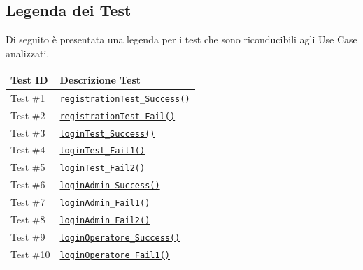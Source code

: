\documentclass{article}
\newcommand{\code}[1]{\texttt{#1}}
\begin{document}
\newpage\subsection*{Legenda dei Test}
Di seguito è presentata una legenda per i test che sono riconducibili agli Use Case analizzati.
\begin{table}[h!]
    \centering
    \begin{tabular}{>{\raggedright}p{} p{}}
        \textbf{Test ID} & \textbf{Descrizione Test} \\
        \hline
        Test \#1 & \hyperref[fig:snippet_LoginClienteControllerTest]{\code{registrationTest\_Success()}}
        \label{test_1}\\
        
        Test \#2 & \hyperref[fig:snippet_LoginClienteControllerTest]{\code{registrationTest\_Fail()}}
        \label{test_2}\\
        
        Test \#3 & \hyperref[fig:snippet_LoginClienteControllerTest]{\code{loginTest\_Success()}}
        \label{test_3}\\
        
        Test \#4 & \hyperref[fig:snippet_LoginClienteControllerTest]{\code{loginTest\_Fail1()}}
        \label{test_4}\\
        
        Test \#5 & \hyperref[fig:snippet_LoginClienteControllerTest]{\code{loginTest\_Fail2()}}
        \label{test_5}\\
        
        Test \#6 & \hyperref[fig:snippet_LoginPersonaleControllerTest]{\code{loginAdmin\_Success()}}
        \label{test_6}\\
        
        Test \#7 & \hyperref[fig:snippet_LoginPersonaleControllerTest]{\code{loginAdmin\_Fail1()}}
        \label{test_7}\\
        
        Test \#8 & \hyperref[fig:snippet_LoginPersonaleControllerTest]{\code{loginAdmin\_Fail2()}}
        \label{test_8}\\

        Test \#9 & \hyperref[fig:snippet_LoginPersonaleControllerTest]{\code{loginOperatore\_Success()}}
        \label{test_9}\\
        
        Test \#10 & \hyperref[fig:snippet_LoginPersonaleControllerTest]{\code{loginOperatore\_Fail1()}}
        \label{test_10}\\
        

\end{tabular}
\end{table}
\end{document}
